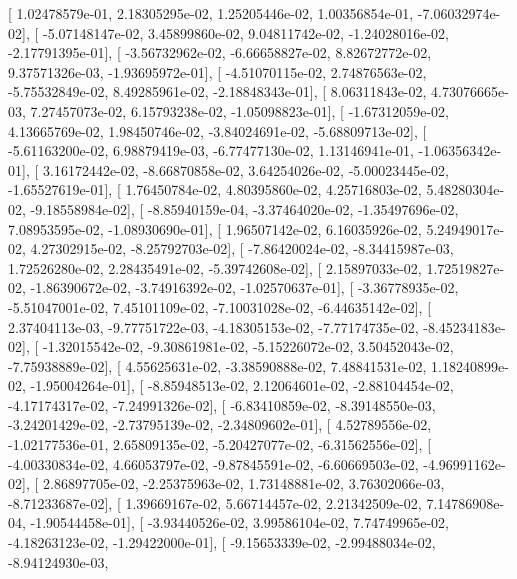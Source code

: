 \documentclass{article}
\begin{document}
       [  1.02478579e-01,   2.18305295e-02,   1.25205446e-02,
          1.00356854e-01,  -7.06032974e-02],
       [ -5.07148147e-02,   3.45899860e-02,   9.04811742e-02,
         -1.24028016e-02,  -2.17791395e-01],
       [ -3.56732962e-02,  -6.66658827e-02,   8.82672772e-02,
          9.37571326e-03,  -1.93695972e-01],
       [ -4.51070115e-02,   2.74876563e-02,  -5.75532849e-02,
          8.49285961e-02,  -2.18848343e-01],
       [  8.06311843e-02,   4.73076665e-03,   7.27457073e-02,
          6.15793238e-02,  -1.05098823e-01],
       [ -1.67312059e-02,   4.13665769e-02,   1.98450746e-02,
         -3.84024691e-02,  -5.68809713e-02],
       [ -5.61163200e-02,   6.98879419e-03,  -6.77477130e-02,
          1.13146941e-01,  -1.06356342e-01],
       [  3.16172442e-02,  -8.66870858e-02,   3.64254026e-02,
         -5.00023445e-02,  -1.65527619e-01],
       [  1.76450784e-02,   4.80395860e-02,   4.25716803e-02,
          5.48280304e-02,  -9.18558984e-02],
       [ -8.85940159e-04,  -3.37464020e-02,  -1.35497696e-02,
          7.08953595e-02,  -1.08930690e-01],
       [  1.96507142e-02,   6.16035926e-02,   5.24949017e-02,
          4.27302915e-02,  -8.25792703e-02],
       [ -7.86420024e-02,  -8.34415987e-03,   1.72526280e-02,
          2.28435491e-02,  -5.39742608e-02],
       [  2.15897033e-02,   1.72519827e-02,  -1.86390672e-02,
         -3.74916392e-02,  -1.02570637e-01],
       [ -3.36778935e-02,  -5.51047001e-02,   7.45101109e-02,
         -7.10031028e-02,  -6.44635142e-02],
       [  2.37404113e-03,  -9.77751722e-03,  -4.18305153e-02,
         -7.77174735e-02,  -8.45234183e-02],
       [ -1.32015542e-02,  -9.30861981e-02,  -5.15226072e-02,
          3.50452043e-02,  -7.75938889e-02],
       [  4.55625631e-02,  -3.38590888e-02,   7.48841531e-02,
          1.18240899e-02,  -1.95004264e-01],
       [ -8.85948513e-02,   2.12064601e-02,  -2.88104454e-02,
         -4.17174317e-02,  -7.24991326e-02],
       [ -6.83410859e-02,  -8.39148550e-03,  -3.24201429e-02,
         -2.73795139e-02,  -2.34809602e-01],
       [  4.52789556e-02,  -1.02177536e-01,   2.65809135e-02,
         -5.20427077e-02,  -6.31562556e-02],
       [ -4.00330834e-02,   4.66053797e-02,  -9.87845591e-02,
         -6.60669503e-02,  -4.96991162e-02],
       [  2.86897705e-02,  -2.25375963e-02,   1.73148881e-02,
          3.76302066e-03,  -8.71233687e-02],
       [  1.39669167e-02,   5.66714457e-02,   2.21342509e-02,
          7.14786908e-04,  -1.90544458e-01],
       [ -3.93440526e-02,   3.99586104e-02,   7.74749965e-02,
         -4.18263123e-02,  -1.29422000e-01],
       [ -9.15653339e-02,  -2.99488034e-02,  -8.94124930e-03,
\end{document}
